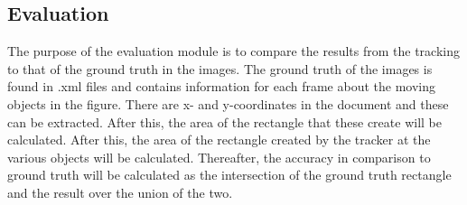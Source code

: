 \subsection{Evaluation}

The purpose of the evaluation module is to compare the results from the tracking to that of the ground truth in the images. The ground truth of the images is found in .xml files and contains information for each frame about the moving objects in the figure. There are x- and y-coordinates in the document and these can be extracted. After this, the area of the rectangle that these create will be calculated. After this, the area of the rectangle created by the tracker at the various objects will be calculated. Thereafter, the accuracy in comparison to ground truth will be calculated as the intersection of the ground truth rectangle and the result over the union of the two. 
